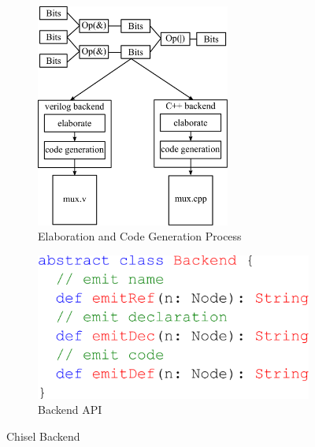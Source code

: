 \begin{figure}[!h]
\centering
  \begin{subfigure}[t]{0.48\textwidth}
  \centering
  \includegraphics[width=0.7\textwidth]{figures/emit.pdf}
  \caption{Elaboration and Code Generation Process}
  \label{fig:emit}
  \end{subfigure}
  \hfill
  \begin{subfigure}[t]{0.48\textwidth}
  \centering
  \includegraphics[width=\textwidth]{figures/backend.pdf}
  \caption{Backend API}
  \label{fig:backendapi}
  \end{subfigure}
\caption{Chisel Backend}
\label{fig:backend}
\end{figure}

